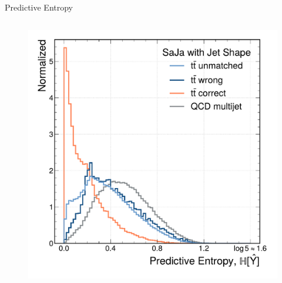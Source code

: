 \begin{frame}[fragile]{Predictive Entropy}
\begin{columns}[T,onlytextwidth]
\begin{figure}
      \includegraphics[width=\textwidth]{fig/entropy/entropy-with-jet-shape.pdf}
    \end{figure}
  \end{columns}
  
\end{frame}


